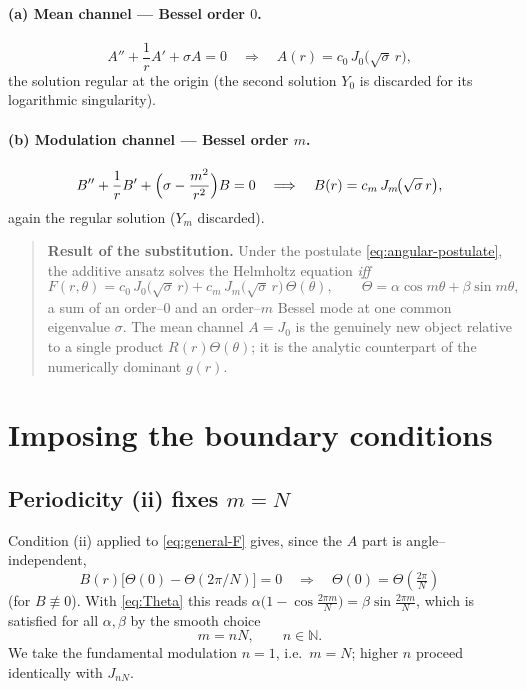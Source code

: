\documentclass{article}
\begin{document}
\paragraph{(a) Mean channel --- Bessel order $0$.}
\begin{equation}
A''+\frac1r A'+\sigma A=0
\quad\Longrightarrow\quad
A(r)=c_0\,J_0\!\bigl(\sqrt\sigma\,r\bigr),
\label{eq:Asol}
\end{equation}
the solution regular at the origin (the second solution $Y_0$ is discarded for
its logarithmic singularity).

\paragraph{(b) Modulation channel --- Bessel order $m$.}
\begin{equation}
B''+\frac1r B'+\Bigl(\sigma-\frac{m^{2}}{r^{2}}\Bigr)B=0
\quad\Longrightarrow\quad
B(r)=c_m\,J_m\!\bigl(\sqrt\sigma\,r\bigr),
\label{eq:Bsol}
\end{equation}
again the regular solution ($Y_m$ discarded).

\begin{quote}
\textbf{Result of the substitution.} Under the postulate
\eqref{eq:angular-postulate}, the additive ansatz solves the Helmholtz equation
\emph{iff}
\begin{equation}
F(r,\theta)=c_0\,J_0\!\bigl(\sqrt\sigma\,r\bigr)
+c_m\,J_m\!\bigl(\sqrt\sigma\,r\bigr)\,\Theta(\theta),
\qquad \Theta=\alpha\cos m\theta+\beta\sin m\theta,
\label{eq:general-F}
\end{equation}
a sum of an order--$0$ and an order--$m$ Bessel mode at one common eigenvalue
$\sigma$. The mean channel $A=J_0$ is the genuinely new object relative to a
single product $R(r)\Theta(\theta)$; it is the analytic counterpart of the
numerically dominant $g(r)$.
\end{quote}

\section{Imposing the boundary conditions}

\subsection{Periodicity (ii) fixes $m=N$}

Condition (ii) applied to \eqref{eq:general-F} gives, since the $A$ part is
angle--independent,
\begin{equation}
B(r)\bigl[\Theta(0)-\Theta(2\pi/N)\bigr]=0
\quad\Longrightarrow\quad
\Theta(0)=\Theta\!\left(\tfrac{2\pi}{N}\right)
\end{equation}
(for $B\not\equiv0$). With \eqref{eq:Theta} this reads
$\alpha\bigl(1-\cos\tfrac{2\pi m}{N}\bigr)=\beta\sin\tfrac{2\pi m}{N}$, which is
satisfied for all $\alpha,\beta$ by the smooth choice
\begin{equation}
m=nN,\qquad n\in\mathbb{N}.
\end{equation}
We take the fundamental modulation $n=1$, i.e.\ $m=N$; higher $n$ proceed
identically with $J_{nN}$.
\end{document}
